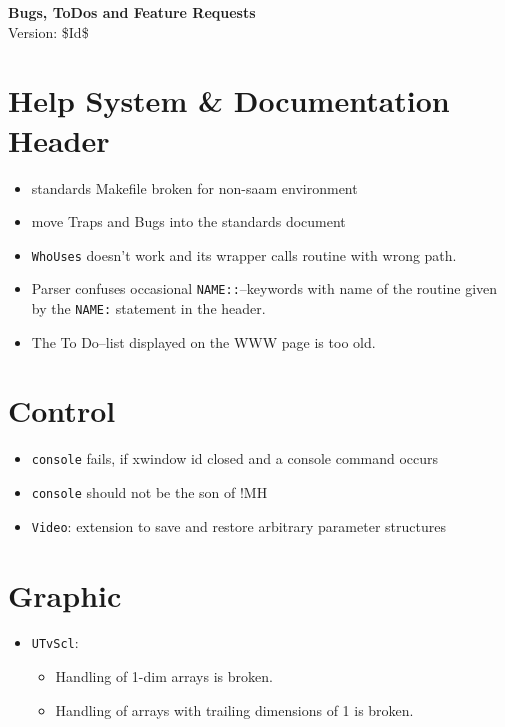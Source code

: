 \documentclass[12pt]{article}
\begin{document}
\begin{center}
{\Huge\textbf{Bugs, ToDos and Feature Requests}}\\[2cm]
Version: \$Id$ $\$ 
\end{center}

\section{Help System \& Documentation Header} 

\begin{itemize}
\item standards Makefile broken for non-saam environment
\item move Traps and Bugs into the standards document
\item \texttt{WhoUses} doesn't work and its wrapper calls routine with wrong path.
\item Parser confuses occasional \texttt{NAME::}--keywords with name
  of the routine given by the \texttt{NAME:} statement in the header.
\item The To Do--list displayed on the WWW page is too old.
\end{itemize}



\section{Control}
\begin{itemize}
\item \texttt{console} fails, if xwindow id closed and a console command occurs
\item \texttt{console} should not be the son of !MH
\item \texttt{Video}: extension to save and restore arbitrary parameter structures
\end{itemize}


\section{Graphic}
\begin{itemize}
\item \texttt{UTvScl}:
\begin{itemize}
  \item Handling of 1-dim arrays is broken.
  \item Handling of arrays with trailing dimensions of 1 is broken.
\end{itemize}
\end{itemize}
\end{document}
